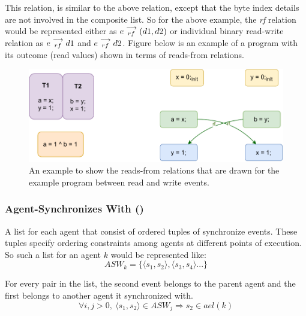            This relation, is similar to the above relation, except that the byte index details are not involved in the composite list. So for the above example, the \textit{rf} relation would be represented either as   
                $e\stackrel{\longrightarrow}{_{rf}}(d1, d2)$
            or individual binary read-write relation as 
                $e\stackrel{\longrightarrow}{_{rf}}d1$ and $e\stackrel{\longrightarrow}{_{rf}}d2$.
            Figure below is an example of a program with its outcome (read values) shown in terms of reads-from relations. 
            \begin{figure}[H]
                \centering
                \includegraphics[scale=0.7]{ECMAScriptMemoryModel/ReadsFrom.pdf}
                \caption{An example to show the reads-from relations that are drawn for the example program between read and write events.}
                \label{read-from}
            \end{figure}
            
        \subsubsection{Agent-Synchronizes With ()}
        
            A list for each agent that consist of ordered tuples of synchronize events. These tuples specify ordering constraints among agents at different points of execution. So such a list for an agent $k$ would be represented like:  
                \[ASW_k = \{ \langle s_1, s_2 \rangle, \langle s_3, s_4 \rangle ...\}\]
        
            For every pair in the list, the second event belongs to the parent agent and the first belongs to another agent it synchronized with.
                \[  
                    \forall{i,j>0},\ 
                    \langle s_1, s_2 \rangle \in ASW_j 
                    \Rightarrow{} 
                    s_2 \in ael(k)                        
                \]

